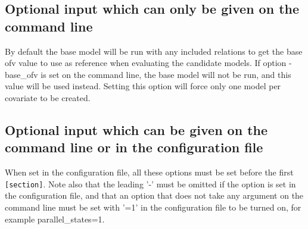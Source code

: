 \subsection{Optional input which can only be given on the command line}
\begin{optionlist}
By default the base model will be run with any included relations to get the base ofv value to use as reference when evaluating the candidate models. If option -base\_ofv is set on the command line, the base model will not be run, and this value will be used instead.
\nextopt
{}
Setting this option will force only one model per covariate to be created.
\nextopt
\end{optionlist}

\subsection{Optional input which can be given on the command line or in the configuration file}
When set in the configuration file, all these options must be set before the first \verb|[section]|. Note also that the leading '-' must be omitted if the option is set in the configuration file, and that an option that does not take any argument on the command line must be set with '=1' in the configuration file to be turned on, for example parallel\_states=1.
